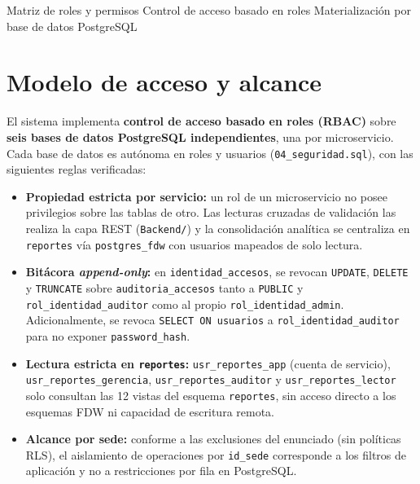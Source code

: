 \documentclass[11pt,oneside]{article}
\begin{document}
  {Matriz de roles y permisos}
  {Control de acceso basado en roles \textperiodcentered{} Materializaci\'on por base de datos PostgreSQL}

\section{Modelo de acceso y alcance}

El sistema implementa \textbf{control de acceso basado en roles (RBAC)} sobre
\textbf{seis bases de datos PostgreSQL independientes}, una por microservicio.
Cada base de datos es aut\'onoma en roles y usuarios (\texttt{04\_seguridad.sql}),
con las siguientes reglas verificadas:

\begin{itemize}[leftmargin=1.5em, itemsep=2.5pt]
  \item \textbf{Propiedad estricta por servicio:} un rol de un microservicio no
        posee privilegios sobre las tablas de otro. Las lecturas cruzadas de
        validaci\'on las realiza la capa REST (\texttt{Backend/}) y la
        consolidaci\'on anal\'itica se centraliza en \texttt{reportes} v\'ia
        \texttt{postgres\_fdw} con usuarios mapeados de solo lectura.
  \item \textbf{Bit\'acora \textit{append-only}:} en
        \texttt{identidad\_accesos}, se revocan \texttt{UPDATE}, \texttt{DELETE}
        y \texttt{TRUNCATE} sobre \texttt{auditoria\_accesos} tanto a
        \texttt{PUBLIC} y \texttt{rol\_identidad\_auditor} como al propio
        \texttt{rol\_identidad\_admin}. Adicionalmente, se revoca
        \texttt{SELECT ON usuarios} a \texttt{rol\_identidad\_auditor} para no
        exponer \texttt{password\_hash}.
  \item \textbf{Lectura estricta en \texttt{reportes}:}
        \texttt{usr\_reportes\_app} (cuenta de servicio),
        \texttt{usr\_reportes\_gerencia}, \texttt{usr\_reportes\_auditor} y
        \texttt{usr\_reportes\_lector} solo consultan las 12 vistas del esquema
        \texttt{reportes}, sin acceso directo a los esquemas FDW ni capacidad de
        escritura remota.
  \item \textbf{Alcance por sede:} conforme a las exclusiones del enunciado
        (sin pol\'iticas RLS), el aislamiento de operaciones por \texttt{id\_sede}
        corresponde a los filtros de aplicaci\'on y no a restricciones por fila
        en PostgreSQL.
\end{itemize}
\end{document}
